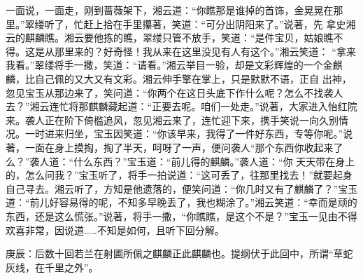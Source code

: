 \begin{parag}
    一面说，一面走，刚到蔷薇架下，湘云道：“你瞧那是谁掉的首饰，金晃晃在那里。”翠缕听了，忙赶上拾在手里攥著，笑道：“可分出阴阳来了。”说著，先 拿史湘云的麒麟瞧。湘云要他拣的瞧，翠缕只管不放手，笑道：“是件宝贝，姑娘瞧不得。这是从那里来的？好奇怪！我从来在这里没见有人有这个。”湘云笑道： “拿来我看。”翠缕将手一撒，笑道：“请看。”湘云举目一验，却是文彩辉煌的一个金麒麟，比自己佩的又大又有文彩。湘云伸手擎在掌上，只是默默不语，正自 出神，忽见宝玉从那边来了，笑问道：“你两个在这日头底下作什么呢？怎么不找袭人去？”湘云连忙将那麒麟藏起道：“正要去呢。咱们一处走。”说著，大家进入怡红院来。袭人正在阶下倚槛追风，忽见湘云来了，连忙迎下来，携手笑说一向久别情况。一时进来归坐，宝玉因笑道：“你该早来，我得了一件好东西，专等你呢。”说著，一面在身上摸掏，掏了半天，呵呀了一声，便问袭人“那个东西你收起来了么？”袭人道：“什么东西？”宝玉道：“前儿得的麒麟。”袭人道：“你 天天带在身上的，怎么问我？”宝玉听了，将手一拍说道：“这可丢了，往那里找去！”就要起身自己寻去。湘云听了，方知是他遗落的，便笑问道：“你几时又有了麒麟了？”宝玉道：“前儿好容易得的呢，不知多早晚丢了，我也糊涂了。”湘云笑道：“幸而是顽的东西，还是这么慌张。”说著，将手一撒，“你瞧瞧，是这个不是？”宝玉一见由不得欢喜非常，因说道……不知是如何，且听下回分解。
\end{parag}


\begin{parag}
    \begin{note}庚辰：后数十回若兰在射圃所佩之麒麟正此麒麟也。提纲伏于此回中，所谓“草蛇灰线，在千里之外”。\end{note}
\end{parag}


